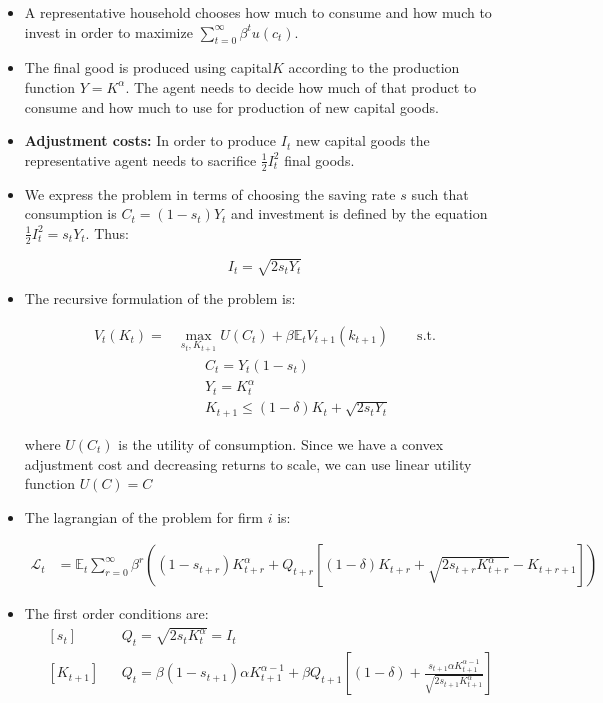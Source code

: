 \documentclass[11pt]{article}
\newcommand{\E}{\mathbb{E}}
\numberwithin{equation}{section}
\begin{document}
\begin{itemize}
	\item A representative household chooses how much to consume and how much to invest in order to maximize $\sum_{t=0}^{\infty} \beta^t u(c_t)$.\medskip
	
	\item The final good is produced using capital$K$ according to the production function $Y=K^{\alpha}$. The agent needs to decide how much of that product to consume and how much to use for production of new capital goods. \medskip
	
	\item \textbf{Adjustment costs:} In order to produce $I_t$ new capital goods the representative agent needs to sacrifice $\frac{1}{2} I^2_t$ final goods.  \medskip
	
	\item We express the problem in terms of choosing the saving rate $s$ such that consumption is $C_t=(1-s_t)Y_t$ and investment is defined by the equation $\frac{1}{2} I_t^2 = s_t Y_t$. Thus: \medskip
	
	$$I_t = \sqrt{2 s_t Y_t}$$
	
	\item The recursive formulation of the problem is:
	
	
	\begin{align*}
	V_t\left(K_t\right) = &\max_{s_t,K_{t+1}} U(C_t) + \beta \E_t V_{t+1}(k_{t+1}) \qquad \text{s.t.}\\
	&\qquad
	C_t = Y_t(1-s_t)\\
	&\qquad
	Y_t = K_t^\alpha\\
	&\qquad
	K_{t+1} \leq (1-\delta) K_t + \sqrt{2 s_t Y_t}
	\end{align*}
	
	where $U(C_t)$ is the utility of consumption. Since we have a convex adjustment cost and decreasing returns to scale, we can use linear utility function $U(C) =C$  \medskip
	
	\item The lagrangian of the problem for firm $i$ is:
	
	\begin{align*}
	\mathcal{L}_{t} &= \E_t \sum_{r=0}^{\infty}\beta^r \left( (1-s_{t+r}) K_{t+r}^\alpha  +   Q_{t+r} \left[(1-\delta) K_{t+r} + \sqrt{2 s_{t+r} K^\alpha_{t+r}}-K_{t+r+1}\right]\right)
	\end{align*}
	
	\item The first order conditions are:
	\begin{align}
	& \left[s_{t}\right] && Q_t = \sqrt{2s_t K^\alpha_t} = I_t \\
	& \left[K_{t+1}\right] && Q_t =\beta (1-s_{t+1}) \alpha K^{\alpha-1}_{t+1} + \beta Q_{t+1} \left[(1-\delta) + \frac{s_{t+1} \alpha K_{t+1}^{\alpha-1}}{\sqrt{2 s_{t+1} K^\alpha_{t+1}}} \right]  
	\end{align}
	

\end{itemize}
\end{document}
